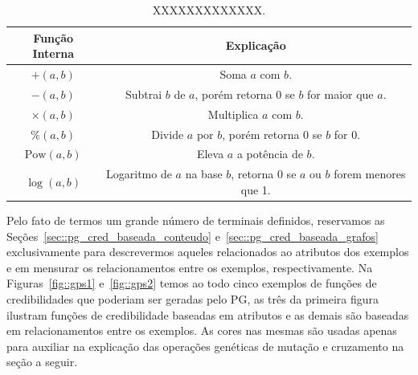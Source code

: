 \begin{table}[ht*]
\centering
\begin{tabular}{|c|c|}
\toprule
    \textbf{Função Interna} & \textbf{Explicação} \\
\midrule
    $+(a,b)$           & Soma $a$ com $b$. \tabularnewline \hline
    $-(a,b)$           & Subtrai $b$ de $a$, porém retorna 0 se $b$ for maior que $a$.\tabularnewline \hline
    $\times(a,b) $     & Multiplica $a$ com $b$. \tabularnewline \hline
    $\%(a,b)$          & Divide $a$ por $b$, porém retorna 0 se $b$ for 0. \tabularnewline \hline
    $\text{Pow}(a,b)$  & Eleva $a$ a potência de $b$. \tabularnewline \hline 
    $\log(a,b) $       & Logaritmo de $a$ na base $b$, retorna 0 se $a$ ou $b$ forem menores que 1. \tabularnewline
\bottomrule
\end{tabular}
\caption{XXXXXXXXXXXXX.}
\label{table::funcoespg}
\end{table}

Pelo fato de termos um grande número de terminais definidos, reservamos as Seções~\ref{sec::pg_cred_baseada_conteudo} e~\ref{sec::pg_cred_baseada_grafos} exclusivamente para descrevermos aqueles relacionados ao atributos dos exemplos e em mensurar os relacionamentos entre os exemplos, respectivamente. 
Na Figuras~\ref{fig::gps1} e~\ref{fig::gps2} temos ao todo cinco exemplos de funções de credibilidades que poderiam ser geradas pelo \textsc{PG}, as três da primeira figura ilustram funções de credibilidade baseadas em atributos e as demais são baseadas em relacionamentos entre os exemplos. As cores nas mesmas são usadas apenas para auxiliar na explicação das operações genéticas de mutação e cruzamento na seção a seguir.

